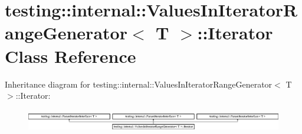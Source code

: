\hypertarget{classtesting_1_1internal_1_1_values_in_iterator_range_generator_1_1_iterator}{}\section{testing\+::internal\+::Values\+In\+Iterator\+Range\+Generator$<$ T $>$\+::Iterator Class Reference}
\label{classtesting_1_1internal_1_1_values_in_iterator_range_generator_1_1_iterator}
Inheritance diagram for testing\+::internal\+::Values\+In\+Iterator\+Range\+Generator$<$ T $>$\+::Iterator\+:\begin{figure}[H]
\begin{center}
\leavevmode
\includegraphics[height=1.011743cm]{d7/ddc/classtesting_1_1internal_1_1_values_in_iterator_range_generator_1_1_iterator}
\end{center}
\end{figure}
